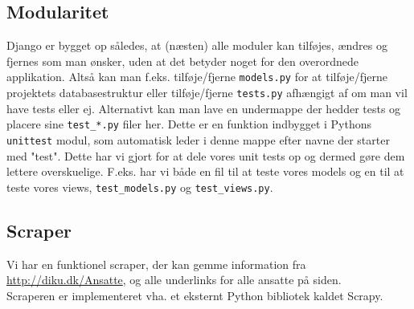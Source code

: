 \documentclass[12pt]{article}
\begin{document}
\subsection{Modularitet}
Django er bygget op således, at (næsten) alle moduler kan tilføjes, ændres og fjernes som man ønsker, uden at det betyder noget for den overordnede applikation. Altså kan man f.eks. tilføje/fjerne \texttt{models.py} for at tilføje/fjerne projektets databasestruktur eller tilføje/fjerne \texttt{tests.py} afhængigt af om man vil have tests eller ej. Alternativt kan man lave en undermappe der hedder tests og placere sine \texttt{test\_*.py} filer her. Dette er en funktion indbygget i Pythons \texttt{unittest} modul, som automatisk leder i denne mappe efter navne der starter med "test".
Dette har vi gjort for at dele vores unit tests op og dermed gøre dem lettere overskuelige. F.eks. har vi både en fil til at teste vores models og en til at teste vores views, \texttt{test\_models.py} og \texttt{test\_views.py}.

\subsection{Scraper}
Vi har en funktionel scraper, der kan gemme information fra \url{http://diku.dk/Ansatte}, og alle underlinks for alle ansatte på siden.\\
Scraperen er implementeret vha. et eksternt Python bibliotek kaldet Scrapy.
\end{document}
